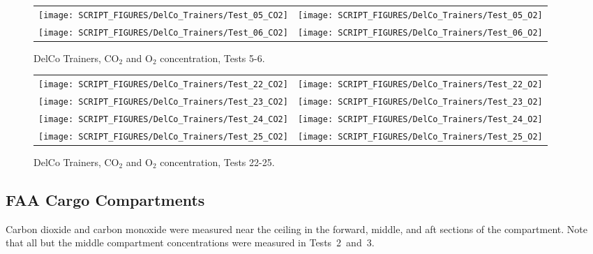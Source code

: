 \newpage

\begin{figure}[p]
\begin{tabular*}{\textwidth}{l@{\extracolsep{\fill}}r}
\texttt{[image: SCRIPT\_FIGURES/DelCo\_Trainers/Test\_05\_CO2]} &
\texttt{[image: SCRIPT\_FIGURES/DelCo\_Trainers/Test\_05\_O2]} \\
\texttt{[image: SCRIPT\_FIGURES/DelCo\_Trainers/Test\_06\_CO2]} &
\texttt{[image: SCRIPT\_FIGURES/DelCo\_Trainers/Test\_06\_O2]}
\end{tabular*}
\caption{DelCo Trainers, CO$_2$ and O$_2$ concentration, Tests 5-6.}
\label{DelCo_CO2_O2_2}
\end{figure}

\begin{figure}[p]
\begin{tabular*}{\textwidth}{l@{\extracolsep{\fill}}r}
\texttt{[image: SCRIPT\_FIGURES/DelCo\_Trainers/Test\_22\_CO2]} &
\texttt{[image: SCRIPT\_FIGURES/DelCo\_Trainers/Test\_22\_O2]} \\
\texttt{[image: SCRIPT\_FIGURES/DelCo\_Trainers/Test\_23\_CO2]} &
\texttt{[image: SCRIPT\_FIGURES/DelCo\_Trainers/Test\_23\_O2]} \\
\texttt{[image: SCRIPT\_FIGURES/DelCo\_Trainers/Test\_24\_CO2]} &
\texttt{[image: SCRIPT\_FIGURES/DelCo\_Trainers/Test\_24\_O2]} \\
\texttt{[image: SCRIPT\_FIGURES/DelCo\_Trainers/Test\_25\_CO2]} &
\texttt{[image: SCRIPT\_FIGURES/DelCo\_Trainers/Test\_25\_O2]}
\end{tabular*}
\caption{DelCo Trainers, CO$_2$ and O$_2$ concentration, Tests 22-25.}
\label{DelCo_CO2_O2_3}
\end{figure}


\clearpage

\subsection{FAA Cargo Compartments}

Carbon dioxide and carbon monoxide were measured near the ceiling in the forward, middle, and aft sections of the compartment. Note that all but the middle compartment concentrations were measured in Tests~2~and~3.


